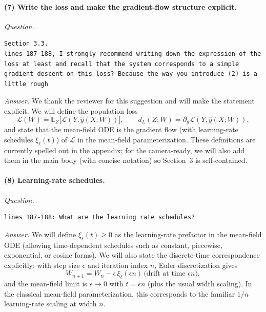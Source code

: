 \documentclass[11pt,a4paper]{article}
\begin{document}
\paragraph{(7) Write the loss and make the gradient-flow structure explicit.}
\textit{Question.}\par
\begin{verbatim}
Section 3.3.
lines 187-188, I strongly recommend writing down the expression of the loss at least and recall that the system corresponds to a simple gradient descent on this loss? Because the way you introduce (2) is a little rough
\end{verbatim}
\textit{Answer.} We thank the reviewer for this suggestion and will make the statement explicit. We will define the population loss
\[
\mathscr{L}(W)=\mathbb{E}_{Z}\big[\mathcal{L}(Y,\hat{y}(X;W))\big],
\qquad d_L(Z;W)=\partial_{\hat y}\mathscr{L}(Y,\hat{y}(X;W)),
\]
and state that the mean-field ODE is the gradient flow (with learning-rate schedules $\xi_\ell(t)$) of $\mathscr{L}$ in the mean-field parameterization. These definitions are currently spelled out in the appendix; for the camera-ready, we will also add them in the main body (with concise notation) so Section~3 is self-contained.

\paragraph{(8) Learning-rate schedules.}
\textit{Question.}\par
\begin{verbatim}
lines 187-188: What are the learning rate schedules?
\end{verbatim}
\textit{Answer.} We will define $\xi_\ell(t)\ge 0$ as the learning-rate prefactor in the mean-field ODE (allowing time-dependent schedules such as constant, piecewise, exponential, or cosine forms). We will also state the discrete-time correspondence explicitly: with step size $\epsilon$ and iteration index $n$, Euler discretization gives
\[
W_{n+1}=W_n-\epsilon\,\xi_\ell(\epsilon n)\,\big(\text{drift at time }\epsilon n\big),
\]
and the mean-field limit is $\epsilon\to 0$ with $t=\epsilon n$ (plus the usual width scaling). In the classical mean-field parameterization, this corresponds to the familiar $1/n$ learning-rate scaling at width $n$.
\end{document}
